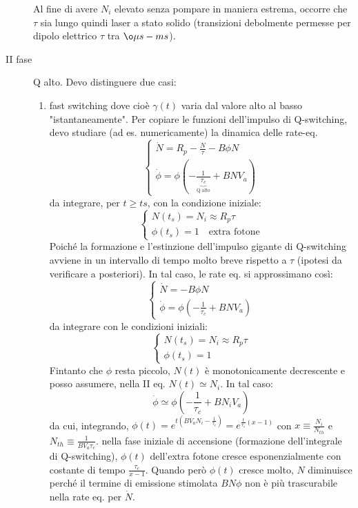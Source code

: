 \documentclass{book}
\theoremstyle{remark}
\begin{document}
\begin{description}
Al fine di avere $N_i$ elevato senza pompare in maniera estrema, occorre che $\tau$ sia lungo quindi laser a stato solido (transizioni debolmente permesse per dipolo elettrico $\tau$ tra $\o \mu s - ms$).
\item [II fase] Q alto.
Devo distinguere due casi:
\begin{enumerate}
\item fast switching dove cioè $\gamma(t)$ varia dal valore alto al basso "istantaneamente". Per copiare le funzioni dell'impulso di Q-switching, devo studiare (ad es. numericamente) la dinamica delle rate-eq.
\begin{equation*}
\begin{cases}
\dot{N} = R_p - \frac{N}{\tau} - B\phi N\\
\dot{\phi} = \phi(-\frac{1}{\underbrace{\tau_c}_\text{Q alto}} + BN V_a)
\end{cases}
\end{equation*}
da integrare, per $t \geq ts$, con la condizione iniziale:
\begin{equation*}
\begin{cases}
N(t_s) = N_i \approx R_p\tau\\
\phi(t_s) = 1 \quad \text{extra fotone}
\end{cases}
\end{equation*}
Poiché la formazione e l'estinzione dell'impulso gigante di Q-switching avviene in un intervallo di tempo molto breve rispetto a $\tau$ (ipotesi da verificare a posteriori). In tal caso, le rate eq. si approssimano così:
\begin{equation*}
\begin{cases}
\dot{N} = - B\phi N\\
\dot{\phi} = \phi(-\frac{1}{\tau_c} + BN V_a)
\end{cases}
\end{equation*}
da integrare con le condizioni iniziali:
\begin{equation*}
\begin{cases}
N(t_s) = N_i \approx R_p\tau\\
\phi(t_s) = 1
\end{cases}
\end{equation*}
Fintanto che $\phi$ resta piccolo, $N(t)$ è monotonicamente decrescente e posso assumere, nella II eq. $N(t) \simeq N_i$. In tal caso:
\begin{equation*}
\dot{\phi} \simeq \phi(-\frac{1}{\tau_c} + BN_iV_a)
\end{equation*}
da cui, integrando, $\phi(t) = e^{t(BV_aN_i - \frac{1}{\tau_c})} = e^{\frac{t}{\tau_c}(x-1)}$ con $x \equiv \frac{N_i}{N_{th}}$ e $N_{th} \equiv \frac{1}{BV_a\tau_c}$. nella fase iniziale di accensione (formazione dell'integrale di Q-switching), $\phi(t)$ dell'extra fotone cresce esponenzialmente con costante di tempo $\frac{\tau_c}{x-1}$. Quando però $\phi(t)$ cresce molto, $N$ diminuisce perché il termine di emissione stimolata $BN\phi$ non è più trascurabile nella rate eq. per $\dot{N}$.

\end{enumerate}
\end{description}
\end{document}
